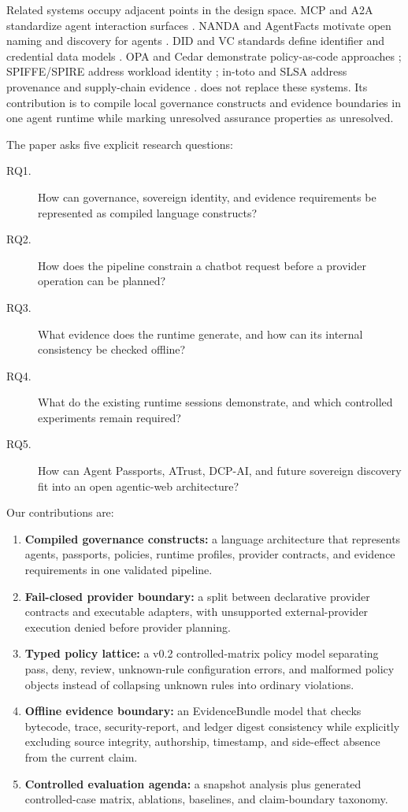 Related systems occupy adjacent points in the design space.  MCP and A2A
standardize agent interaction surfaces \citep{mcp_spec_2025,a2a_spec}.  NANDA
and AgentFacts motivate open naming and discovery for agents
\citep{projectnanda2026,raskar2025beyonddns}.  DID and VC standards define
identifier and credential data models
\citep{w3c_did_core_2022,w3c_vc_data_model_2025}.  OPA and Cedar demonstrate
policy-as-code approaches \citep{opa_docs,cedar_policy}; SPIFFE/SPIRE address
workload identity \citep{spiffe_overview,spire_overview}; in-toto and SLSA
address provenance and supply-chain evidence
\citep{torresarias2019intoto,slsa_spec}.  \Argorix does not replace these
systems.  Its contribution is to compile local governance constructs and
evidence boundaries in one agent runtime while marking unresolved assurance
properties as unresolved.

The paper asks five explicit research questions:
\begin{description}
\item[RQ1.] How can governance, sovereign identity, and evidence requirements
be represented as compiled language constructs?
\item[RQ2.] How does the \Argorix pipeline constrain a chatbot request before a
provider operation can be planned?
\item[RQ3.] What evidence does the runtime generate, and how can its internal
consistency be checked offline?
\item[RQ4.] What do the existing runtime sessions demonstrate, and which
controlled experiments remain required?
\item[RQ5.] How can Agent Passports, ATrust, DCP-AI, and future sovereign
discovery fit into an open agentic-web architecture?
\end{description}

Our contributions are:
\begin{enumerate}
\item \textbf{Compiled governance constructs:} a language architecture that
represents agents, passports, policies, runtime profiles, provider contracts,
and evidence requirements in one validated pipeline.
\item \textbf{Fail-closed provider boundary:} a split between declarative
provider contracts and executable adapters, with unsupported external-provider
execution denied before provider planning.
\item \textbf{Typed policy lattice:} a v0.2 controlled-matrix policy model
separating pass, deny, review, unknown-rule configuration errors, and malformed
policy objects instead of collapsing unknown rules into ordinary violations.
\item \textbf{Offline evidence boundary:} an EvidenceBundle model that checks
bytecode, trace, security-report, and ledger digest consistency while
explicitly excluding source integrity, authorship, timestamp, and side-effect
absence from the current claim.
\item \textbf{Controlled evaluation agenda:} a snapshot analysis plus generated
controlled-case matrix, ablations, baselines, and claim-boundary taxonomy.
\end{enumerate}

